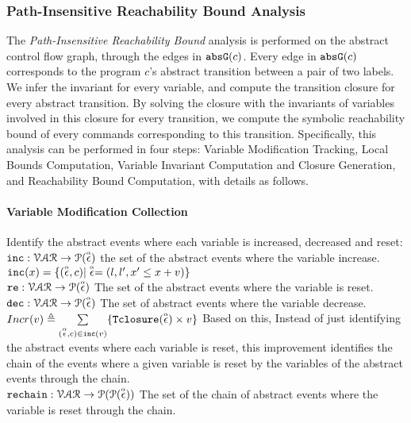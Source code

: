 \subsubsection{Path-Insensitive Reachability Bound Analysis}
\label{sec:pathinsensitive_rb}
The \emph{Path-Insensitive Reachability Bound} analysis is performed on the abstract control flow graph, 
through the edges in $\mathtt{abs}{\mathtt{G}}(c)$.
Every edge in $\mathtt{abs}{\mathtt{G}}(c)$ corresponds to the program $c$'s abstract transition between a pair of two labels.
We infer the invariant for every variable, and compute the transition closure for every abstract transition. By solving the closure
with the invariants of variables involved in this closure for every transition, we compute
the symbolic reachability bound of every commands corresponding to this transition. Specifically, this analysis can be performed in four steps:
 Variable Modification Tracking, Local Bounds Computation,
Variable Invariant Computation and Closure Generation, and Reachability Bound Computation,
% 
with details as follows.
%
%
\paragraph*{Variable Modification Collection}
Identify the abstract events where each variable is increased, decreased and reset:
\\
$\mathtt{inc}: \mathcal{VAR} \to \mathcal{P}(\stackrel{\scriptscriptstyle{\alpha}}{\mathtt{\epsilon}{}}) $
the set of the abstract events where the variable increase.
\\
$\mathtt{inc}(x) = \{(\stackrel{\scriptscriptstyle{\alpha}}{\mathtt{\epsilon}{}}, c) | \stackrel{\scriptscriptstyle{\alpha}}{\mathtt{\epsilon}{}} = (l, l', x' \leq x + v)\}$
\\
$\mathtt{re}: \mathcal{VAR} \to \mathcal{P}(\stackrel{\scriptscriptstyle{\alpha}}{\mathtt{\epsilon}{}}) $
The set of the abstract events where the variable is reset.
\\
$\mathtt{dec}: \mathcal{VAR} \to \mathcal{P}(\stackrel{\scriptscriptstyle{\alpha}}{\mathtt{\epsilon}{}}) $
The set of abstract events where the variable decrease.
\\
$Incr(v) \triangleq \sum\limits_{(\stackrel{\scriptscriptstyle{\alpha}}{\mathtt{\epsilon}{}}, c) \in \mathtt{inc}(v)}\{{\mathtt{Tclosure}}(\stackrel{\scriptscriptstyle{\alpha}}{\mathtt{\epsilon}{}}) \times v\}$
%
Based on this, 
Instead of just identifying the abstract events where each variable is reset,
this improvement identifies the chain of the events where a given variable is reset by the 
variables of the abstract events through the chain.
\\
$\mathtt{rechain}: \mathcal{VAR} \to \mathcal{P}(\mathcal{P}(\stackrel{\scriptscriptstyle{\alpha}}{\mathtt{\epsilon}{}})) $
The set of the chain of abstract events where the variable is reset through the chain.
%
